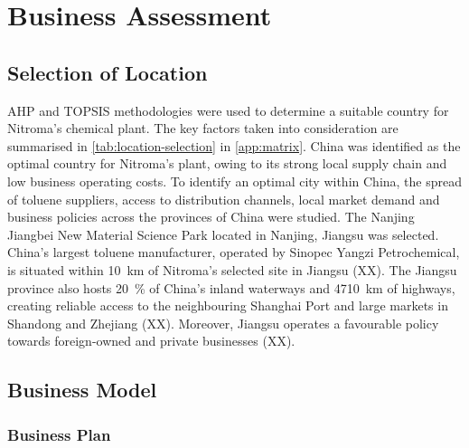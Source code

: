 \section{Business Assessment}
\label{sec:economics}
\subsection{Selection of Location} 
AHP and TOPSIS methodologies were used to determine a suitable country for Nitroma’s chemical plant. The key factors taken into consideration are summarised in \cref{tab:location-selection} in \cref{app:matrix}. China was identified as the optimal country for Nitroma's plant, owing to its strong local supply chain and low business operating costs. To identify an optimal city within China, the spread of toluene suppliers, access to distribution channels, local market demand and business policies across the provinces of China were studied. The Nanjing Jiangbei New Material Science Park located in Nanjing, Jiangsu was selected. China’s largest toluene manufacturer, operated by Sinopec Yangzi Petrochemical, is situated within \SI{10}{\km} of Nitroma’s selected site in Jiangsu (XX). The Jiangsu province also hosts \SI{20}{\percent} of China’s inland waterways and \SI{4710}{\km} of highways, creating reliable access to the neighbouring Shanghai Port and large markets in Shandong and Zhejiang (XX). Moreover, Jiangsu operates a favourable policy towards foreign-owned and private businesses (XX). 


\subsection{Business Model} 
\subsubsection{Business Plan}

